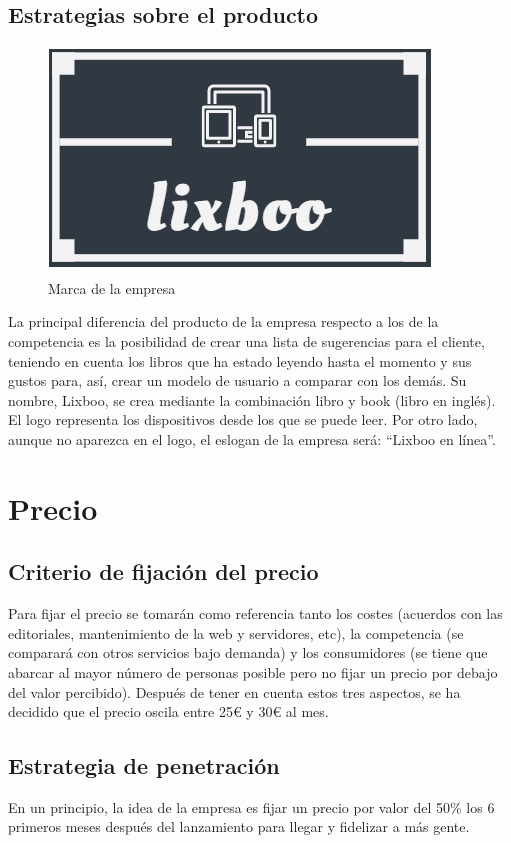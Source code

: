 \documentclass[openany,overnay,a4paper, twoside, 12pt]{book}
\begin{document}
\subsection{Estrategias sobre el producto}
\begin{figure}
\includegraphics[width=0.75\linewidth]{imagenes/lixboo.png}
\caption{Marca de la empresa}
\end{figure}
La principal diferencia del producto de la empresa respecto a los de la competencia es la posibilidad de crear una lista de sugerencias para el cliente, teniendo en cuenta los libros que ha estado leyendo hasta el momento y sus gustos para, así, crear un modelo de usuario a comparar con los demás.
\clearpage %
Su nombre, Lixboo, se crea mediante la combinación libro y book (libro en inglés). El logo representa los dispositivos desde los que se puede leer.
Por otro lado, aunque no aparezca en el logo, el eslogan de la empresa será: “Lixboo en línea”.
\section{Precio}
\subsection{Criterio de fijación del precio}
Para fijar el precio se tomarán como referencia tanto los costes (acuerdos con las editoriales, mantenimiento de la web y servidores, etc), la competencia (se comparará con otros servicios bajo demanda) y los consumidores (se tiene que abarcar al mayor número de personas posible pero no fijar un precio por debajo del valor percibido). Después de tener en cuenta estos tres aspectos, se ha decidido que el precio oscila entre 25€ y 30€ al mes.
\subsection{Estrategia de penetración}
En un principio, la idea de la empresa es fijar un precio por valor del 50\% los 6 primeros meses después del lanzamiento para llegar y fidelizar a más gente.
\end{document}
